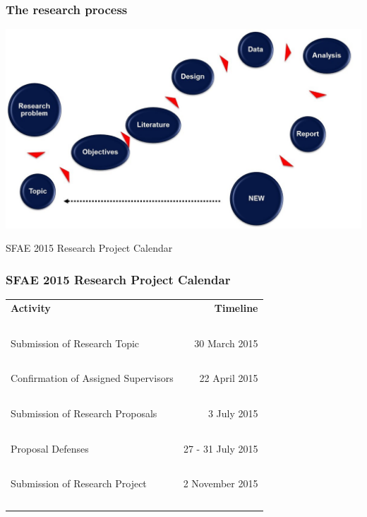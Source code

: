 \documentclass{beamer}
\begin{document}
\begin{frame}
\frametitle{\textbf{The research process}}
\includegraphics[width=\textwidth]{Research_proces}
\end{frame}



\begin{frame}
\Large{\centerline{SFAE 2015 Research Project Calendar}}
\end{frame}

\begin{frame}
\frametitle{\textbf{SFAE 2015 Research Project Calendar}}
\begin{tabular} {|lr|}
\hline
\textbf{\large Activity} & \textbf{\large Timeline}\\~\\
\large Submission of Research Topic & \large 30 March 2015\\~\\
\large Confirmation of Assigned Supervisors & \large 22 April 2015\\~\\
\large Submission of Research Proposals & \large 3 July 2015\\~\\
\large Proposal Defenses & \large 27 - 31 July 2015\\~\\
\large Submission of Research Project & \large 2 November 2015\\~\\
\hline




\end{tabular}

\end{frame}
\end{document}
